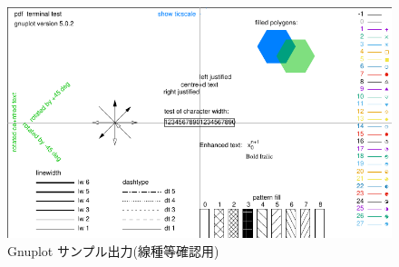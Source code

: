 \begin{landscape}
 \begin{figure}[tbp]%
  \centering%
  \includegraphics[width=25cm]{sample.pdf}%
  \caption{Gnuplot サンプル出力(線種等確認用)}%
  \label{fig:sample}%
 \end{figure}%
\end{landscape}
